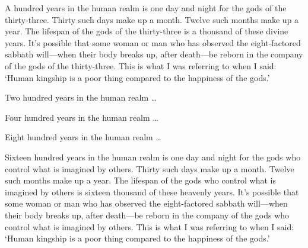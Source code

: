 \documentclass[12pt,openany]{book}%
\begin{document}
A hundred years in the human realm is one day and night for the gods of the thirty-three. Thirty such days make up a month. Twelve such months make up a year. The lifespan of the gods of the thirty-three is a thousand of these divine years. It’s possible that some woman or man who has observed the eight-factored sabbath will—when their body breaks up, after death—be reborn in the company of the gods of the thirty-three. This is what I was referring to when I said: ‘Human kingship is a poor thing compared to the happiness of the gods.’ 

Two hundred years in the human realm … 

Four hundred years in the human realm … 

Eight hundred years in the human realm … 

Sixteen hundred years in the human realm is one day and night for the gods who control what is imagined by others. Thirty such days make up a month. Twelve such months make up a year. The lifespan of the gods who control what is imagined by others is sixteen thousand of these heavenly years. It’s possible that some woman or man who has observed the eight-factored sabbath will—when their body breaks up, after death—be reborn in the company of the gods who control what is imagined by others. This is what I was referring to when I said: ‘Human kingship is a poor thing compared to the happiness of the gods.’ 
\end{document}
